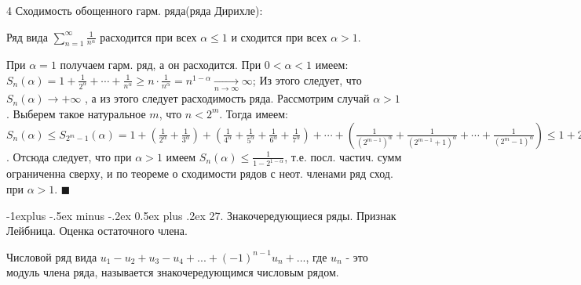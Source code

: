 \documentclass[unicode,10pt, landscape]{article}
\makeatletter
\renewcommand{\subsection}{\@startsection{subsection}{2}{0mm}%
                                {-1explus -.5ex minus -.2ex}%
                                {0.5ex plus .2ex}%
                                {\normalfont\normalsize\bfseries}}
\newenvironment{Proof} %
{\par\noindent{\bf Док-во:}} %
{\hfill$\scriptstyle\blacksquare$}
\makeatother
\begin{document}
\begin{multicols}{4}
Сходимость обощенного гарм. ряда(ряда Дирихле):
\begin{Th}
Ряд вида $\sum_{n = 1}^{\infty}\frac{1}{n^\alpha}$ расходится при всех $\alpha \leq 1$ и сходится при всех $\alpha > 1$.
\begin{Proof}
При $\alpha=1$ получаем гарм. ряд, а он расходится. При $0<\alpha<1$ имеем: $S_{n}(\alpha)=1+ \frac{1}{2^{\alpha}}+\cdots +\frac{1}{n^{\alpha}}\geq n \cdot \frac{1}{n^{\alpha}}=n^{1-\alpha}\underset{n\rightarrow \infty }{\rightarrow}\infty$; Из этого следует, что $S_{n}(\alpha)\rightarrow +\infty$ , а из этого следует расходимость ряда. Рассмотрим случай $\alpha>1$. Выберем такое натуральное $m$, что $n<2^{m}$. Тогда имеем: $S_{n}(\alpha)\leq S_{2^{m}-1}(\alpha)=1+\left ( \frac{1}{2^{\alpha}}+\frac{1}{3^{\alpha}} \right )+\left ( \frac{1}{4^{\alpha}}+\frac{1}{5^{\alpha}}+\frac{1}{6^{\alpha}}+\frac{1}{7^{\alpha}} \right )+ \cdots +\left ( \frac{1}{(2^{m-1})^{\alpha}}+\frac{1}{(2^{m-1}+1)^{\alpha}}+\cdots +\frac{1}{(2^{m}-1)^{\alpha}} \right )\leq 1+2^{1-\alpha}+(2^{2})^{1-\alpha}+\cdots +(2^{m-1})^{1-\alpha}=1+2^{1-\alpha}+(2^{1-\alpha})^{2}+\cdots +(2^{1-\alpha})^{m-1}=\frac{1-(2^{1-\alpha})^{m}}{1-2^{1-\alpha}}$. Отсюда следует, что при $\alpha>1$ имеем $S_{n}(\alpha)\leq \frac{1}{1-2^{1-\alpha}}$, т.е. посл. частич. сумм ограниченна сверху, и по теореме о сходимости рядов с неот. членами ряд сход. при $\alpha>1$.
\end{Proof}
\end{Th}


\subsection{27. Знакочередующиеся ряды. Признак Лейбница. Оценка остаточного члена.}
\begin{Def}
Числовой ряд вида $u_{1}-u_2+u_3-u_4+...+(-1)^{n-1}u_n+...$, где $u_n$ - это модуль члена ряда, называется знакочередующимся числовым рядом.
\end{Def}


\end{multicols}
\end{document}
